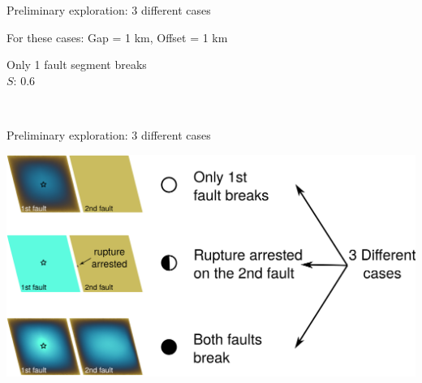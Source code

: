 \documentclass{beamer}
\begin{document}
\begin{frame}
 {Preliminary exploration: 3 different cases}

 \begin{center}
 For these cases: Gap = 1 km, Offset = 1 km \\
 \vskip 0.4cm
 \begin{minipage}{0.45\linewidth}
    \centering \small Only 1 fault segment breaks \\
    $S$: 0.6
 \end{minipage} \quad 
 \begin{minipage}{0.45\linewidth}
  \quad \hfill \quad
 \end{minipage} \\
 \begin{minipage}{0.45\linewidth}
  \quad \hfill \quad
  \end{minipage}
 \end{center}
 
\end{frame}


\begin{frame}
 {Preliminary exploration: 3 different cases}

 \includegraphics[width=1\linewidth]{images/cases.png}
 \addtocounter{framenumber}{-1}
 
\end{frame}
\end{document}
